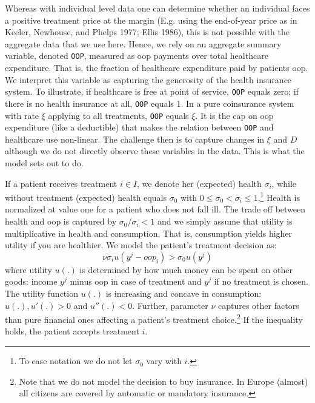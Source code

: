 \documentclass[a4paper,12pt]{article}
\makeatletter
\newcommand{\citeprocitem}[2]{\hyper@linkstart{cite}{citeproc_bib_item_#1}#2\hyper@linkend}
\makeatother
\begin{document}
Whereas with individual level data one can determine whether an individual faces a positive treatment price at the margin (E.g. using the end-of-year price as in \citeprocitem{15}{Keeler, Newhouse, and Phelps 1977}; \citeprocitem{12}{Ellis 1986}), this is not possible with the aggregate data that we use here. Hence, we rely on an aggregate summary variable, denoted \texttt{OOP}, measured as oop payments over total healthcare expenditure. That is, the fraction of healthcare expenditure paid by patients oop. We interpret this variable as capturing the generosity of the health insurance system. To illustrate, if healthcare is free at point of service, \texttt{OOP} equals zero; if there is no health insurance at all, \texttt{OOP} equals 1. In a pure coinsurance system with rate \(\xi\) applying to all treatments, \texttt{OOP} equals \(\xi\). It is the cap on oop expenditure (like a deductible) that makes the relation between \texttt{OOP} and healthcare use non-linear. The challenge then is to capture changes in \(\xi\) and \(D\) although we do not directly observe these variables in the data. This is what the model sets out to do.

If a patient receives treatment \(i \in I\), we denote her (expected) health \(\sigma_i\), while without treatment (expected) health equals \(\sigma_0\) with \(0 \leq \sigma_0 < \sigma_i \leq 1\).\footnote{To ease notation we do not let \(\sigma_0\) vary with \(i\).} Health is normalized at value one for a patient who does not fall ill. The trade off between health and oop is captured by \(\sigma_0/\sigma_i <1\) and we simply assume that utility is multiplicative in health and consumption. That is, consumption yields higher utility if you are healthier. We model the patient's treatment decision as:
\begin{equation}
\label{eq:1}
\nu \sigma_i u(y^j-oop_i) > \sigma_0 u(y^j)
\end{equation}
where utility \(u(.)\) is determined by how much money can be spent on other goods: income \(y^j\) minus oop in case of treatment and \(y^j\) if no treatment is chosen. The utility function \(u(.)\) is increasing and concave in consumption: \(u(.), u'(.) >0\) and \(u''(.) < 0\). Further, parameter \(\nu\) captures other factors than pure financial ones affecting a patient's treatment choice.\footnote{Note that we do not model the decision to buy insurance. In Europe (almost) all citizens are covered by automatic or mandatory insurance.} If the inequality holds, the patient accepts treatment \(i\).
\end{document}
